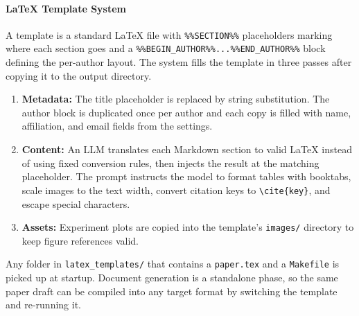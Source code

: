 \paragraph{\LaTeX{} Template System}
A template is a standard \LaTeX{} file with \texttt{\%\%SECTION\%\%} placeholders marking where each section goes and a \texttt{\%\%BEGIN\_AUTHOR\%\%...\%\%END\_AUTHOR\%\%} block defining the per-author layout.
The system fills the template in three passes after copying it to the output directory.

\begin{enumerate}[nosep]
	\item \textbf{Metadata:} The title placeholder is replaced by string substitution. The author block is duplicated once per author and each copy is filled with name, affiliation, and email fields from the settings.
	\item \textbf{Content:} An LLM translates each Markdown section to valid \LaTeX{} instead of using fixed conversion rules, then injects the result at the matching placeholder. The prompt instructs the model to format tables with booktabs, scale images to the text width, convert citation keys to \texttt{\textbackslash cite\{key\}}, and escape special characters.
	\item \textbf{Assets:} Experiment plots are copied into the template's \texttt{images/} directory to keep figure references valid.
\end{enumerate}

Any folder in \texttt{latex\_templates/} that contains a \texttt{paper.tex} and a \texttt{Makefile} is picked up at startup.
Document generation is a standalone phase, so the same paper draft can be compiled into any target format by switching the template and re-running it.
